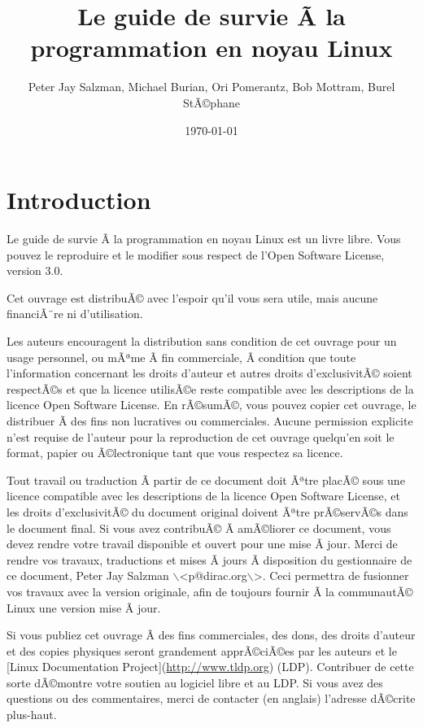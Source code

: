 \documentclass[11pt]{article}
\author{Peter Jay Salzman, Michael Burian, Ori Pomerantz, Bob Mottram, Burel StÃ©phane}
\date{\today}
\title{Le guide de survie Ã  la programmation en noyau Linux}
\begin{document}
\maketitle
\tableofcontents


\section*{Introduction}
\label{sec-1}

Le guide de survie Ã  la programmation en noyau Linux est un livre libre. Vous pouvez le reproduire et le modifier sous respect de l'Open Software License, version 3.0.

Cet ouvrage est distribuÃ© avec l'espoir qu'il vous sera utile, mais aucune financiÃ¨re ni d'utilisation.

Les auteurs encouragent la distribution sans condition de cet ouvrage pour un usage personnel, ou mÃªme Ã  fin commerciale, Ã  condition que toute l'information concernant les droits d'auteur et autres droits d'exclusivitÃ© soient respectÃ©s et que la licence utilisÃ©e reste compatible avec les descriptions de la licence Open Software License. En rÃ©sumÃ©, vous pouvez copier cet ouvrage, le distribuer Ã  des fins non lucratives ou commerciales. Aucune permission explicite n'est requise de l'auteur pour la reproduction de cet ouvrage quelqu'en soit le format, papier ou Ã©lectronique tant que vous respectez sa licence.

Tout travail ou traduction Ã  partir de ce document doit Ãªtre placÃ© sous une licence compatible avec les descriptions de la licence Open Software License, et les droits d'exclusivitÃ© du document original doivent Ãªtre prÃ©servÃ©s dans le document final. Si vous avez contribuÃ© Ã  amÃ©liorer ce document, vous devez rendre votre travail disponible et ouvert pour une mise Ã  jour. Merci de rendre vos travaux, traductions et mises Ã  jours Ã  disposition du gestionnaire de ce document, Peter Jay Salzman $\backslash$<p@dirac.org$\backslash$>. Ceci permettra de fusionner vos travaux avec la version originale, afin de toujours fournir Ã  la communautÃ© Linux une version mise Ã  jour.

Si vous publiez cet ouvrage Ã  des fins commerciales, des dons, des droits d'auteur et des copies physiques seront grandement apprÃ©ciÃ©es par les auteurs et le [Linux Documentation Project](\url{http://www.tldp.org}) (LDP). Contribuer de cette sorte dÃ©montre votre soutien au logiciel libre et au LDP. Si vous avez des questions ou des commentaires, merci de contacter (en anglais) l'adresse dÃ©crite plus-haut.
\end{document}
